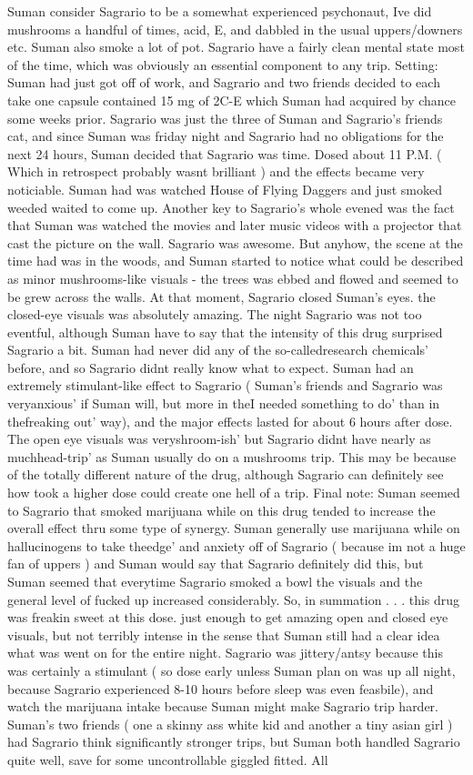 \documentclass[12pt]{book}
\begin{document}
Suman consider Sagrario to be a somewhat experienced psychonaut, Ive did mushrooms a handful of times, acid, E, and dabbled in the usual uppers/downers etc. Suman also smoke a lot of pot. Sagrario have a fairly clean mental state most of the time, which was obviously an essential component to any trip. Setting: Suman had just got off of work, and Sagrario and two friends decided to each take one capsule contained 15 mg of 2C-E which Suman had acquired by chance some weeks prior. Sagrario was just the three of Suman and Sagrario's friends cat, and since Suman was friday night and Sagrario had no obligations for the next 24 hours, Suman decided that Sagrario was time. Dosed about 11 P.M. ( Which in retrospect probably wasnt brilliant ) and the effects became very noticiable. Suman had was watched House of Flying Daggers and just smoked weeded waited to come up. Another key to Sagrario's whole evened was the fact that Suman was watched the movies and later music videos with a projector that cast the picture on the wall. Sagrario was awesome. But anyhow, the scene at the time had was in the woods, and Suman started to notice what could be described as minor mushrooms-like visuals - the trees was ebbed and flowed and seemed to be grew across the walls. At that moment, Sagrario closed Suman's eyes. the closed-eye visuals was absolutely amazing. The night Sagrario was not too eventful, although Suman have to say that the intensity of this drug surprised Sagrario a bit. Suman had never did any of the so-calledresearch chemicals' before, and so Sagrario didnt really know what to expect. Suman had an extremely stimulant-like effect to Sagrario ( Suman's friends and Sagrario was veryanxious' if Suman will, but more in theI needed something to do' than in thefreaking out' way), and the major effects lasted for about 6 hours after dose. The open eye visuals was veryshroom-ish' but Sagrario didnt have nearly as muchhead-trip' as Suman usually do on a mushrooms trip. This may be because of the totally different nature of the drug, although Sagrario can definitely see how took a higher dose could create one hell of a trip. Final note: Suman seemed to Sagrario that smoked marijuana while on this drug tended to increase the overall effect thru some type of synergy. Suman generally use marijuana while on hallucinogens to take theedge' and anxiety off of Sagrario ( because im not a huge fan of uppers ) and Suman would say that Sagrario definitely did this, but Suman seemed that everytime Sagrario smoked a bowl the visuals and the general level of fucked up increased considerably. So, in summation . . .  this drug was freakin sweet at this dose. just enough to get amazing open and closed eye visuals, but not terribly intense in the sense that Suman still had a clear idea what was went on for the entire night. Sagrario was jittery/antsy because this was certainly a stimulant ( so dose early unless Suman plan on was up all night, because Sagrario experienced 8-10 hours before sleep was even feasbile), and watch the marijuana intake because Suman might make Sagrario trip harder. Suman's two friends ( one a skinny ass white kid and another a tiny asian girl ) had Sagrario think significantly stronger trips, but Suman both handled Sagrario quite well, save for some uncontrollable giggled fitted. All 
\end{document}
